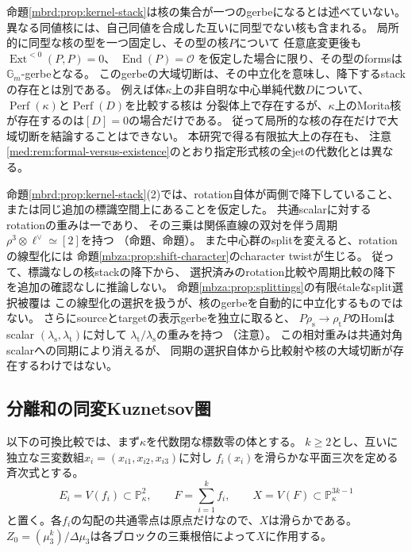 \begin{remark}
\label{mbrd:rem:kernel-section}
命題\ref{mbrd:prop:kernel-stack}は核の集合が一つのgerbeになるとは述べていない。
異なる同値核には、自己同値を合成した互いに同型でない核も含まれる。
局所的に同型な核の型を一つ固定し、その型の核$P$について
任意底変更後も
$\operatorname{Ext}^{<0}(P,P)=0$、
$\operatorname{End}(P)=\mathcal O$
を仮定した場合に限り、その型のformsは$\mathbb G_m$-gerbeとなる。
このgerbeの大域切断は、その中立化を意味し、降下するstackの存在とは別である。
例えば体$\kappa$上の非自明な中心単純代数$D$について、
$\operatorname{Perf}(\kappa)$と$\operatorname{Perf}(D)$を比較する核は
分裂体上で存在するが、$\kappa$上のMorita核が存在するのは$[D]=0$の場合だけである。
従って局所的な核の存在だけで大域切断を結論することはできない。
本研究で得る有限拡大上の存在も、
注意\ref{med:rem:formal-versus-existence}のとおり指定形式核の全jetの代数化とは異なる。
\end{remark}

\begin{remark}[rotationを付加する前提]
\label{mbrd:rem:rotation-framing}
命題\ref{mbrd:prop:kernel-stack}(2)では、rotation自体が両側で降下していること、
または同じ追加の標識空間上にあることを仮定した。
共通scalarに対するrotationの重みは一であり、
その三乗は関係直線の双対を伴う周期
$\rho^3\otimes\ell^\vee\simeq[2]$を持つ
（命題、命題）。
また中心群のsplitを変えると、rotationの線型化には
命題\ref{mbza:prop:shift-character}のcharacter twistが生じる。
従って、標識なしの核stackの降下から、
選択済みのrotation比較や周期比較の降下を追加の確認なしに推論しない。
命題\ref{mbza:prop:splittings}の有限\'etaleなsplit選択被覆は
この線型化の選択を扱うが、核のgerbeを自動的に中立化するものではない。
さらにsourceとtargetの表示gerbeを独立に取ると、
$P\rho_{\mathrm s}\to\rho_{\mathrm t}P$のHomはscalar
$(\lambda_{\mathrm s},\lambda_{\mathrm t})$に対して
$\lambda_{\mathrm t}/\lambda_{\mathrm s}$の重みを持つ
（注意）。
この相対重みは共通対角scalarへの同期により消えるが、
同期の選択自体から比較射や核の大域切断が存在するわけではない。
\end{remark}

\subsection{分離和の同変Kuznetsov圏}

以下の可換比較では、まず$\kappa$を代数閉な標数零の体とする。
$k\ge2$とし、互いに独立な三変数組$x_i=(x_{i1},x_{i2},x_{i3})$に対し
$f_i(x_i)$を滑らかな平面三次を定める斉次式とする。
\[
 E_i=V(f_i)\subset\mathbb P^2_\kappa,\qquad
 F=\sum_{i=1}^kf_i,\qquad
 X=V(F)\subset\mathbb P^{3k-1}_\kappa
\]
と置く。各$f_i$の勾配の共通零点は原点だけなので、$X$は滑らかである。
$Z_0=(\mu_3^k)/\Delta\mu_3$は各ブロックの三乗根倍によって$X$に作用する。


